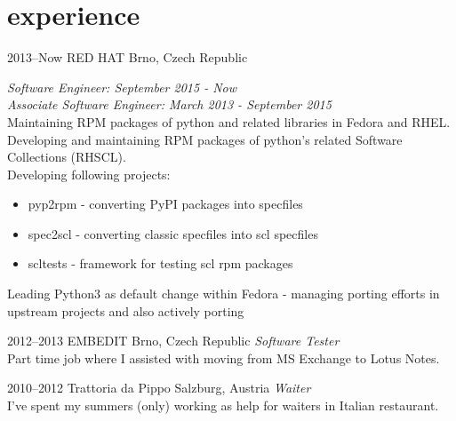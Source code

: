 \documentclass[]{friggeri-cv} %
\begin{document}

\section{experience}


\begin{entrylist}


\entry
{2013--Now}
{RED HAT}
{Brno, Czech Republic}
{\emph{Software Engineer: September 2015 - Now} \\
\emph{Associate Software Engineer: March 2013 - September 2015} \\
Maintaining RPM packages of python and related libraries 
in Fedora and RHEL.\\ Developing and maintaining RPM packages of python's related Software 
Collections (RHSCL). \\ Developing following projects:
\begin{itemize}
\item pyp2rpm - converting PyPI packages into specfiles
\item spec2scl - converting classic specfiles into scl specfiles
\item scltests - framework for testing scl rpm packages
\end{itemize}
Leading Python3 as default change within Fedora - managing porting efforts in upstream projects
and also actively porting}


\entry
{2012--2013}
{EMBEDIT}
{Brno, Czech Republic}
{\emph{Software Tester} \\ Part time job where I assisted with moving from MS Exchange to Lotus Notes.}

\entry
{2010--2012}
{Trattoria da Pippo}
{Salzburg, Austria}
{\emph{Waiter} \\ I've spent my summers (only) working as help for waiters in Italian restaurant.}
\end{entrylist}


\end{document}
